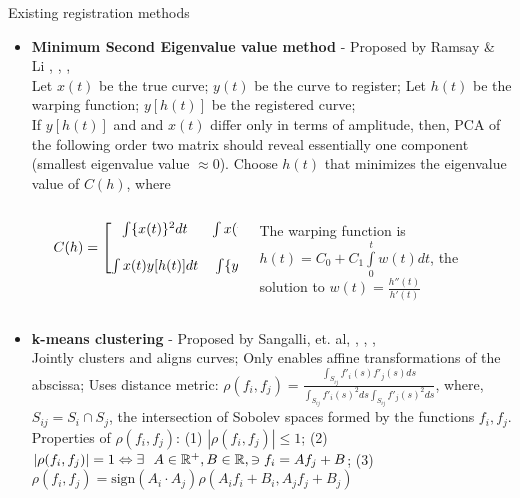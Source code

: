 \documentclass[final]{beamer}
\newlength{\sepwid}
\newlength{\onecolwid}
\begin{document}
\begin{frame}{}
\begin{columns}[t]
\begin{column}{\onecolwid}
      \begin{block}{Existing registration methods}
        \begin{itemize}
          \item {\bf{Minimum Second Eigenvalue value method}} - Proposed by Ramsay \& Li \cite{Ramsay_Li_1998_JRSSB}, \cite{Ramsay_Silverman_2002_Applied}, \cite{Ramsay_2006_Functional}, \cite{R-fda}  \\
            Let $x(t)$ be the true curve; $y(t)$ be the curve to register; Let $h(t)$ be the warping function; $y[h(t)]$ be the registered curve; \\
          If $y[h(t)]$ and and $x(t)$ differ only in terms of amplitude, then, PCA of the following order two matrix should reveal essentially one component (smallest eigenvalue value $\approx 0$). Choose $h(t)$ that minimizes the eigenvalue value of $C(h)$, where
          \begin{columns}
            \begin{column}{\sepwid}\end{column}			%
            \begin{column}{0.55\textwidth}
              $C(h) = 
              \begin{bmatrix}
                \int \{x(t) \}^2dt & \int x(t) y[h(t)]dt \vspace{0.5cm} \\ 
                \int x(t) y[h(t)]dt & \int \{y[h(t)]\}^2dt
              \end{bmatrix}$
            \end{column}
            \begin{column}{0.45\textwidth}
              The warping function is $h(t) = C_0 + C_1\int\limits_0^t w(t)dt$, the \\solution to $w(t) = \frac{h''(t)}{h'(t)}$
            \end{column}
          \end{columns}
          \item {\bf{k-means clustering}} - Proposed by Sangalli, et. al, \cite{Sangalli_etal_2009_JASA}, \cite{Sangalli_etal_2010_CSDA}, \cite{Sangalli_etal_2014_EJS}, \cite{R-fdakma}\\
            Jointly clusters and aligns curves; Only enables affine transformations of the abscissa; Uses distance metric: $ \rho(f_i, f_j) = \frac{\int _{S_{ij}}f'_i(s)f'_j(s) ds}{\int _{S_{ij}}f'_i(s)^2 ds \int _{S_{ij}}f'_j(s)^2 ds} $, where, $S_{ij} = S_i \cap S_j$, the intersection of Sobolev spaces formed by the functions $f_i, f_j$. Properties of $\rho(f_i, f_j)$: (1) $|\rho(f_i, f_j)| \leq 1$; (2) $|\rho(f_i, f_j)| = 1 \Leftrightarrow \exists \ \ A \in \mathbb{R} ^+, B \in \mathbb{R}, \ni f_i = Af_j + B$; (3) $\rho(f_i, f_j) = \text{sign}(A_i\cdot A_j) \rho(A_if_i + B_i, A_jf_j + B_j)$

\end{itemize}
\end{block}
\end{column}
\end{columns}
\end{frame}
\end{document}
